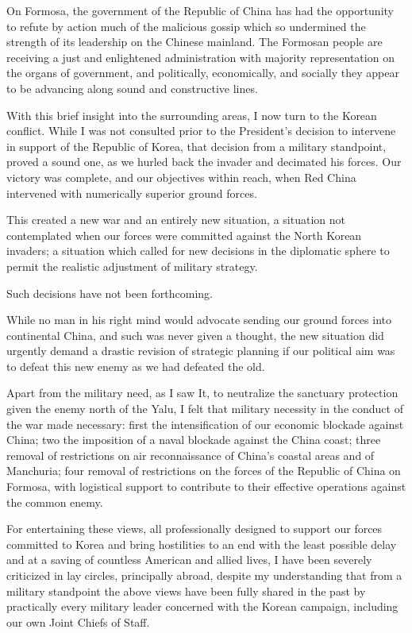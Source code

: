 \documentclass[a4paper]{amsbook}
\begin{document}
On Formosa, the government of the Republic of China has had the opportunity to refute by action much of the malicious gossip which so undermined the strength of its leadership on the Chinese mainland. The Formosan people are receiving a just and enlightened administration with majority representation on the organs of government, and politically, economically, and socially they appear to be advancing along sound and constructive lines.

With this brief insight into the surrounding areas, I now turn to the Korean conflict. While I was not consulted prior to the President's decision to intervene in support of the Republic of Korea, that decision from a military standpoint, proved a sound one, as we hurled back the invader and decimated his forces. Our victory was complete, and our objectives within reach, when Red China intervened with numerically superior ground forces.

This created a new war and an entirely new situation, a situation not contemplated when our forces were committed against the North Korean invaders; a situation which called for new decisions in the diplomatic sphere to permit the realistic adjustment of military strategy.

Such decisions have not been forthcoming.

While no man in his right mind would advocate sending our ground forces into continental China, and such was never given a thought, the new situation did urgently demand a drastic revision of strategic planning if our political aim was to defeat this new enemy as we had defeated the old.

Apart from the military need, as I saw It, to neutralize the sanctuary protection given the enemy north of the Yalu, I felt that military necessity in the conduct of the war made necessary: first the intensification of our economic blockade against China; two the imposition of a naval blockade against the China coast; three removal of restrictions on air reconnaissance of China's coastal areas and of Manchuria; four removal of restrictions on the forces of the Republic of China on Formosa, with logistical support to contribute to their effective operations against the common enemy.

For entertaining these views, all professionally designed to support our forces committed to Korea and bring hostilities to an end with the least possible delay and at a saving of countless American and allied lives, I have been severely criticized in lay circles, principally abroad, despite my understanding that from a military standpoint the above views have been fully shared in the past by practically every military leader concerned with the Korean campaign, including our own Joint Chiefs of Staff.
\end{document}
